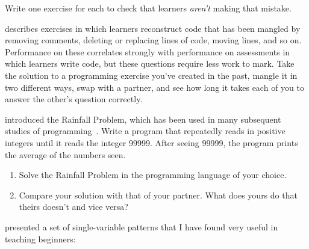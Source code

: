 \noindent
Write one exercise for each to check that learners \emph{aren't} making that mistake.


\cite{Chen2017} describes exercises in which learners reconstruct code that has been mangled
by removing comments,
deleting or replacing lines of code,
moving lines,
and so on.
Performance on these correlates strongly with performance on assessments
in which learners write code,
but these questions require less work to mark.
Take the solution to a programming exercise you've created in the past,
mangle it in two different ways,
swap with a partner,
and see how long it takes each of you to answer the other's question correctly.


\cite{Solo1986} introduced the Rainfall Problem,
which has been used in many subsequent studies of programming~\cite{Fisl2014,Simo2013,Sepp2015}.
Write a program that repeatedly reads in positive integers until it reads the integer 99999.
After seeing 99999,
the program prints the average of the numbers seen.

\begin{enumerate}

\item
  Solve the Rainfall Problem in the programming language of your choice.

\item
  Compare your solution with that of your partner.
  What does yours do that theirs doesn't and vice versa?

\end{enumerate}


\cite{Kuit2004,Byck2005,Saja2006} presented a set of single-variable patterns
that I have found very useful in teaching beginners:

